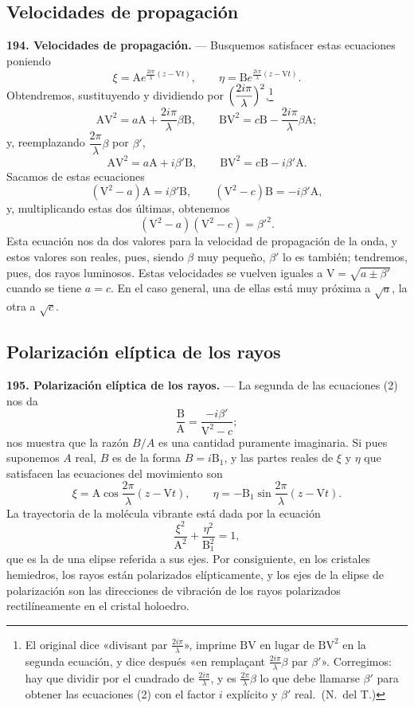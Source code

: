 \subsection{Velocidades de propagación}

\noindent\textbf{194. Velocidades de propagación.} — Busquemos
satisfacer estas ecuaciones poniendo
\[
\xi=\mathrm Ae^{\frac{2i\pi}{\lambda}(z-\mathrm Vt)},\qquad
\eta=\mathrm Be^{\frac{2i\pi}{\lambda}(z-\mathrm Vt)}.
\]
Obtendremos, sustituyendo y dividiendo por
$\Bigl(\dfrac{2i\pi}{\lambda}\Bigr)^2$,\footnote{El original dice
«divisant par $\frac{2i\pi}{\lambda}$», imprime $\mathrm{BV}$ en lugar de
$\mathrm{BV}^2$ en la segunda ecuación, y dice después «en remplaçant
$\frac{2i\pi}{\lambda}\beta$ par $\beta'$». Corregimos: hay que dividir
por el cuadrado de $\frac{2i\pi}{\lambda}$, y es $\frac{2\pi}{\lambda}\beta$
lo que debe llamarse $\beta'$ para obtener las ecuaciones (2) con el factor
$i$ explícito y $\beta'$ real.~(N.~del T.)}
\[
\mathrm{AV}^2=a\mathrm A+\frac{2i\pi}{\lambda}\beta\mathrm B,\qquad
\mathrm{BV}^2=c\mathrm B-\frac{2i\pi}{\lambda}\beta\mathrm A;
\]
y, reemplazando $\dfrac{2\pi}{\lambda}\beta$ por $\beta'$,
\begin{equation}
\mathrm{AV}^2=a\mathrm A+i\beta'\mathrm B,\qquad \mathrm{BV}^2=c\mathrm B-i\beta'\mathrm A.
\tag{2}
\end{equation}
Sacamos de estas ecuaciones
\[
(\mathrm V^2-a)\mathrm A=i\beta'\mathrm B,\qquad (\mathrm V^2-c)\mathrm B=-i\beta'\mathrm A,
\]
y, multiplicando estas dos últimas, obtenemos
\begin{equation}
(\mathrm V^2-a)(\mathrm V^2-c)=\beta'^2.
\tag{3}
\end{equation}
Esta ecuación nos da dos valores para la velocidad de propagación de la
onda, y estos valores son reales, pues, siendo $\beta$ muy pequeño,
$\beta'$ lo es también; tendremos, pues, dos rayos luminosos. Estas
velocidades se vuelven iguales a $\mathrm V=\sqrt{a\pm\beta'}$ cuando se
tiene $a=c$. En el caso general, una de ellas está muy próxima a
$\sqrt a$, la otra a $\sqrt c$.

\subsection{Polarización elíptica de los rayos}

\noindent\textbf{195. Polarización elíptica de los rayos.} — La segunda
de las ecuaciones (2) nos da
\[
\frac{\mathrm B}{\mathrm A}=\frac{-i\beta'}{\mathrm V^2-c};
\]
nos muestra que la razón $B/A$ es una cantidad puramente imaginaria. Si
pues suponemos $A$ real, $B$ es de la forma $B=i\mathrm B_1$, y las partes
reales de $\xi$ y $\eta$ que satisfacen las ecuaciones del movimiento son
\[
\xi=\mathrm A\cos\frac{2\pi}{\lambda}(z-\mathrm Vt),\qquad
\eta=-\mathrm B_1\sin\frac{2\pi}{\lambda}(z-\mathrm Vt).
\]
La trayectoria de la molécula vibrante está dada por la ecuación
\[
\frac{\xi^2}{\mathrm A^2}+\frac{\eta^2}{\mathrm B_1^2}=1,
\]
que es la de una elipse referida a sus ejes. Por consiguiente, en los
cristales hemiedros, los rayos están polarizados elípticamente, y los
ejes de la elipse de polarización son las direcciones de vibración de los
rayos polarizados rectilíneamente en el cristal holoedro.

